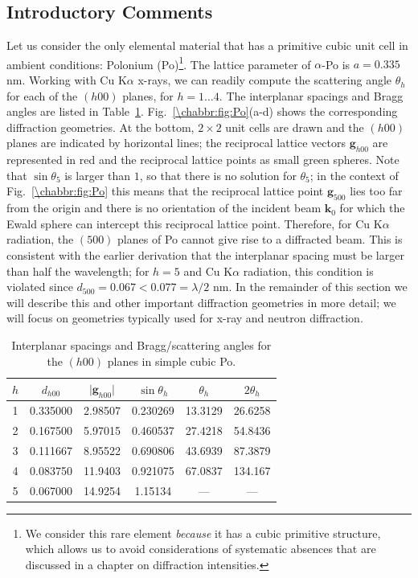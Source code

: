 \subsection{Introductory Comments}\label{\chabbr:sec:IntroComments}
Let us consider the only elemental material that has a primitive cubic unit cell in ambient conditions: Polonium (Po)\footnote{We consider this rare element \textit{because} it has a cubic primitive structure, which allows us to avoid considerations of systematic absences that are discussed in a chapter on diffraction intensities.}. The lattice parameter of $\alpha$-Po is $a=0.335$ nm.   Working with Cu K$\alpha$ x-rays, we can readily compute the scattering angle $\theta_h$ for each of the $(h00)$ planes, for $h=1\ldots 4$. The interplanar spacings and Bragg angles are listed in Table~\ref{\chabbr:tb:Po}.  Fig.~\ref{\chabbr:fig:Po}(a-d) shows the corresponding diffraction geometries.  At the bottom, $2\times 2$ unit cells are drawn and the $(h00)$ planes are indicated by horizontal lines; the reciprocal lattice vectors $\mathbf{g}_{h00}$ are represented in red and the reciprocal lattice points as small green spheres.  Note that $\sin\theta_5$ is larger than $1$, so that there is no solution for $\theta_5$; in the context of Fig.~\ref{\chabbr:fig:Po} this means that the reciprocal lattice point $\mathbf{g}_{500}$ lies too far from the origin and there is no orientation of the incident beam $\mathbf{k}_0$ for which the Ewald sphere can intercept this reciprocal lattice point.  Therefore, for Cu K$\alpha$ radiation, the $(500)$ planes of Po cannot give rise to a diffracted beam. This is consistent with the earlier derivation that the interplanar spacing must be  larger than half the wavelength; for $h=5$ and Cu K$\alpha$ radiation, this condition is violated since $d_{500}=0.067<0.077=\lambda/2$ nm.  In the remainder of this section we will describe this and other important diffraction geometries in more detail; we will focus on geometries typically used for x-ray and neutron diffraction.

\begin{table}[h!]
\centering\leavevmode
\begin{tabular}{cccccc}
\hline
 $h$   &    $d_{h00}$  &  $\vert\mathbf{g}_{h00}\vert$ &  $\sin\theta_h$  & $\theta_h$  & $2\theta_h$ \\
\hline\hline
       1 &      0.335000 &       2.98507 &      0.230269 &       13.3129 &       26.6258\\
       2 &      0.167500 &       5.97015 &      0.460537 &       27.4218 &       54.8436\\
       3 &      0.111667 &       8.95522 &      0.690806 &       43.6939 &       87.3879\\
       4 &     0.083750 &       11.9403 &      0.921075 &       67.0837 &       134.167\\
       5 &     0.067000 &       14.9254 &       1.15134 &           --- &           ---\\
\hline
\end{tabular}
\caption{\label{\chabbr:tb:Po}Interplanar spacings and Bragg/scattering angles for the $(h00)$ planes in simple cubic Po.}
\end{table}

